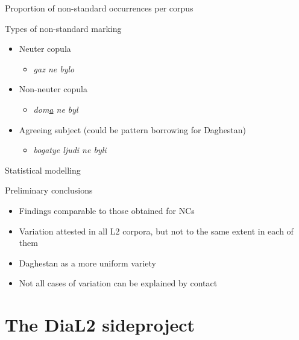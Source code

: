 \documentclass[
  ignorenonframetext,
  t]{beamer}
\providecommand{\tightlist}{%
  \setlength{\itemsep}{0pt}\setlength{\parskip}{0pt}}\usepackage{longtable,booktabs,array}
\begin{document}
\begin{frame}{Proportion of non-standard occurrences per corpus}
\label{proportion-of-non-standard-occurrences-per-corpus-1}
\end{frame}

\begin{frame}{Types of non-standard marking}
\label{types-of-non-standard-marking}
\begin{itemize}
\tightlist
\item
  Neuter copula

  \begin{itemize}
  \tightlist
  \item
    \emph{gaz ne bylo}
  \end{itemize}
\item
  Non-neuter copula

  \begin{itemize}
  \tightlist
  \item
    \emph{dom\ul{a} ne byl}
  \end{itemize}
\item
  Agreeing subject (could be pattern borrowing for Daghestan)

  \begin{itemize}
  \tightlist
  \item
    \emph{bogatye ljudi ne byli}
  \end{itemize}
\end{itemize}
\end{frame}

\begin{frame}{Statistical modelling}
\label{statistical-modelling-1}
\end{frame}

\begin{frame}{Preliminary conclusions}
\label{preliminary-conclusions}
\begin{itemize}
\tightlist
\item
  Findings comparable to those obtained for NCs
\item
  Variation attested in all L2 corpora, but not to the same extent in
  each of them
\item
  Daghestan as a more uniform variety
\item
  Not all cases of variation can be explained by contact
\end{itemize}
\end{frame}

\section{The DiaL2 sideproject}\label{the-dial2-sideproject}
\end{document}
